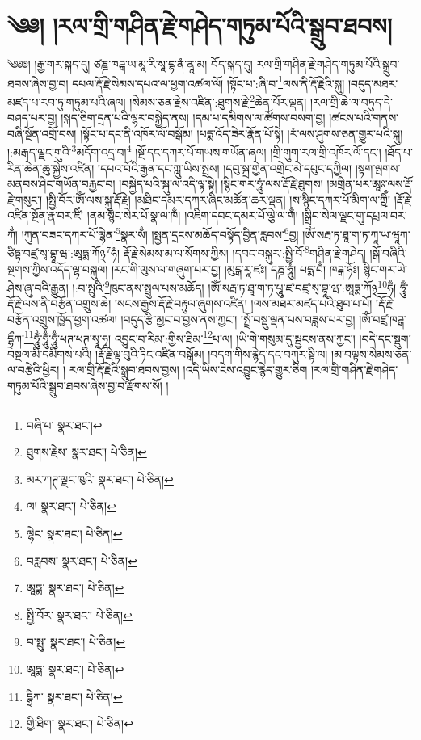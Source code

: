 \setcounter{footnote}{0} 
\chapter{༄༅། །རལ་གྲི་གཤིན་རྗེ་གཤེད་གཏུམ་པོའི་སྒྲུབ་ཐབས།}༄༅༅། །རྒྱ་གར་སྐད་དུ། ཙཎྜ་ཁཌྒ་ཡ་མཱ་རི་སཱ་དྷ་ནཾ་ནཱ་མ། བོད་སྐད་དུ། རལ་གྲི་གཤིན་རྗེ་གཤེད་གཏུམ་པོའི་སྒྲུབ་ཐབས་ཞེས་བྱ་བ། དཔལ་རྡོ་རྗེ་སེམས་དཔའ་ལ་ཕྱག་འཚལ་ལོ། །སྟོང་པ་:ཞི་བ་\footnote{བཞི་པ་  སྣར་ཐང་། }ལས་ནི་རྡོ་རྗེའི་སྐུ། །བདུད་མཐར་མཛད་པ་རབ་ཏུ་གཏུམ་པའི་ཞལ། །སེམས་ཅན་རྗེས་འཛིན་:ཐུགས་རྗེ་\footnote{ཐུགས་རྗེས་  སྣར་ཐང་།  པེ་ཅིན། }ཆེན་པོར་ལྡན། །རལ་གྲི་ཆེ་ལ་བཏུད་དེ་བཤད་པར་བྱ། །སྐད་ཅིག་དྲན་པའི་ལྷར་བསྐྱེད་ནས། །དམ་པ་དམིགས་ལ་ཚོགས་བསག་བྱ། །ཚངས་པའི་གནས་བཞི་སྔོན་འགྲོ་བས། །སྟོང་པ་དང་ནི་འཁོར་ལོ་བསྒོམ། །པདྨ་འོད་ཟེར་རྣོན་པོ་སྟེ། །རཾ་ལས་ཤུགས་ཅན་གྱུར་པའི་སྐུ། །:མརྒད་ལྗང་གུའི་\footnote{མར་ཀཊ་ལྗང་ཁུའི་  སྣར་ཐང་།  པེ་ཅིན། }མདོག་འདྲ་བ།\footnote{ལ།  སྣར་ཐང་།  པེ་ཅིན། } །སྔོ་དང་དཀར་པོ་གཡས་གཡོན་ཞལ། །གྲི་གུག་རལ་གྲི་འཁོར་ལོ་དང་། །ཐོད་པ་རིན་ཆེན་ཆུ་སྐྱེས་འཛིན། །དཔའ་བོའི་རྒྱན་དང་ཀླུ་ཡིས་སྤྲས། །དབུ་སྐྲ་གྱེན་འགྲེང་མེ་དཔུང་དཀྱིལ། །སྟག་ལྤགས་མནབས་ཤིང་གཡོན་བརྐྱང་བ། །བསྐྱེད་པའི་སྐུ་ལ་འདི་ལྟ་སྟེ། །སྙིང་གར་ཧཱུཾ་ལས་རྡོ་རྗེ་ཐུགས། །མགྲིན་པར་ཨཱཿ་ལས་རྡོ་རྗེ་གསུང་། །སྤྱི་བོར་ཨོཾ་ལས་སྐུ་རྡོ་རྗེ། །མཐིང་དམར་དཀར་ཞིང་མཚོན་ཆར་ལྡན། །ས་སྙིང་དཀར་པོ་མིག་ལ་ཀྵིྃ། །རྡོ་རྗེ་འཛིན་སྔོན་རྣ་བར་ཛིཾ། །ནམ་སྙིང་སེར་པོ་སྣ་ལ་ཁྃ། །འཇིག་དབང་དམར་པོ་ལྕེ་ལ་གྃ། །སྒྲིབ་སེལ་ལྗང་གུ་དཔྲལ་བར་ཀྃ། །ཀུན་བཟང་དཀར་པོ་ལྷེན་\footnote{ལྷེང་  སྣར་ཐང་།  པེ་ཅིན། }སྣར་སྃ། །སྤྱན་དྲངས་མཆོད་བསྟོད་བྱིན་རླབས་\footnote{བརླབས་  སྣར་ཐང་།  པེ་ཅིན། }བྱ། །ཨོཾ་སརྦ་ཏ་ཐཱ་ག་ཏ་ཀཱ་ཡ་ཝཱཀ་ཙིཏྟ་བཛྲ་སྭ་བྷཱ་ཝ་:ཨཱཏྨ་ཀོ྅\footnote{ཨཱཏྨ་  སྣར་ཐང་།  པེ་ཅིན། }ཧཾ། རྡོ་རྗེ་སེམས་མ་ལ་སོགས་ཀྱིས། །དབང་བསྐུར་:སྤྱི་བོ་\footnote{སྤྱི་བོར་  སྣར་ཐང་།  པེ་ཅིན། }གཤིན་རྗེ་གཤེད། །སྒོ་བཞིའི་སྔགས་ཀྱིས་འདོད་ལྷ་བསྐུལ། །རང་གི་ལུས་ལ་གཞུག་པར་བྱ། །མུངྒ་རཱ་ཛཿ། དཎྜ་ཧཱུཾ། པདྨ་བྃ། ཁཌྒ་ཧོཿ། སྙིང་གར་ཡེ་ཤེས་ཞུ་བའི་རྒྱུན། །:བ་སྤུའི་\footnote{བ་སྤུ་  སྣར་ཐང་།  པེ་ཅིན། }ཁུང་ནས་སྤྲུལ་པས་མཆོད། །ཨོཾ་སརྦ་ཏ་ཐཱ་ག་ཏ་པཱུ་ཛ་བཛྲ་སྭ་བྷཱ་ཝ་:ཨཱཏྨ་ཀོ྅\footnote{ཨཱཏྨ་  སྣར་ཐང་།  པེ་ཅིན། }ཧྃ། ཧཱུྃ་རྡོ་རྗེ་ལས་ནི་བརྩོན་འགྲུས་ཆེ། །སངས་རྒྱས་རྡོ་རྗེ་བརྟུལ་ཞུགས་འཛིན། །ལས་མཐར་མཛད་པའི་ཐུབ་པ་པོ། །རྡོ་རྗེ་བརྩོན་འགྲུས་ཁྱོད་ཕྱག་འཚལ། །བདུད་རྩི་མྱང་བ་བྱས་ནས་ཀྱང་། །སྤྲོ་བསྡུ་ལྡན་པས་བཟླས་པར་བྱ། །ཨོཾ་བཛྲ་ཁཌྒ་དྷྲྀཀ་\footnote{དྷྲིཀ་  སྣར་ཐང་།  པེ་ཅིན། }ཧཱུྃ་ཧཱུྃ་ཧཱུྃ་ཕཊ་ཕཊ་སྭཱ་ཧཱ། འབྱུང་བ་རིམ་:གྱིས་ཐིམ་\footnote{གྱི་ཐིག་  སྣར་ཐང་།  པེ་ཅིན། }པ་ལ། །ཡི་གེ་གསུམ་དུ་སྦྱངས་ནས་ཀྱང་། །བདེ་དང་སྡུག་བསྔལ་མི་དམིགས་པའི། །རྡོ་རྗེ་ལྟ་བུའི་ཏིང་འཛིན་བསྒོམ། །བདག་གིས་རྙེད་དང་བཀུར་སྟི་ལ། །མ་བལྟས་སེམས་ཅན་ལ་བརྩེའི་ཕྱིར། །
རལ་གྲི་རྡོ་རྗེའི་སྒྲུབ་ཐབས་བྱས། །འདི་ཡིས་ངེས་འབྱུང་རྙེད་གྱུར་ཅིག །རལ་གྲི་གཤིན་རྗེ་གཤེད་གཏུམ་པོའི་སྒྲུབ་ཐབས་ཞེས་བྱ་བ་རྫོགས་སོ། ། 